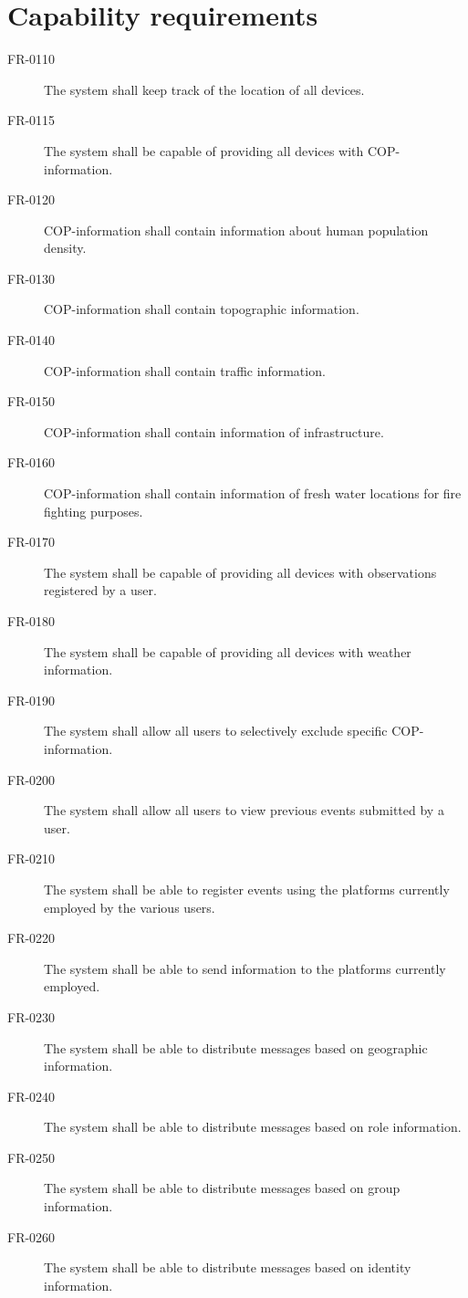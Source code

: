\section{Capability requirements}

\begin{description}
  \item[FR-0110] The system shall keep track of the location of all devices.
  \item[FR-0115] The system shall be capable of providing all devices with COP-information.
  \item[FR-0120] COP-information shall contain information about human population density.
  \item[FR-0130] COP-information shall contain topographic information.
  \item[FR-0140] COP-information shall contain traffic information.
  \item[FR-0150] COP-information shall contain information of infrastructure.
  \item[FR-0160] COP-information shall contain information of fresh water locations for fire fighting purposes.
  \item[FR-0170] The system shall be capable of providing all devices with observations registered by a user. %
  \item[FR-0180] The system shall be capable of providing all devices with weather information.
  \item[FR-0190] The system shall allow all users to selectively exclude specific COP-information.
  \item[FR-0200] The system shall allow all users to view previous events submitted by a user.
  \item[FR-0210] The system shall be able to register events using the platforms currently employed by the various users.
  \item[FR-0220] The system shall be able to send information to the platforms currently employed.
  \item[FR-0230] The system shall be able to distribute messages based on geographic information.
  \item[FR-0240] The system shall be able to distribute messages based on role information.
  \item[FR-0250] The system shall be able to distribute messages based on group information.
  \item[FR-0260] The system shall be able to distribute messages based on identity information.

\end{description}